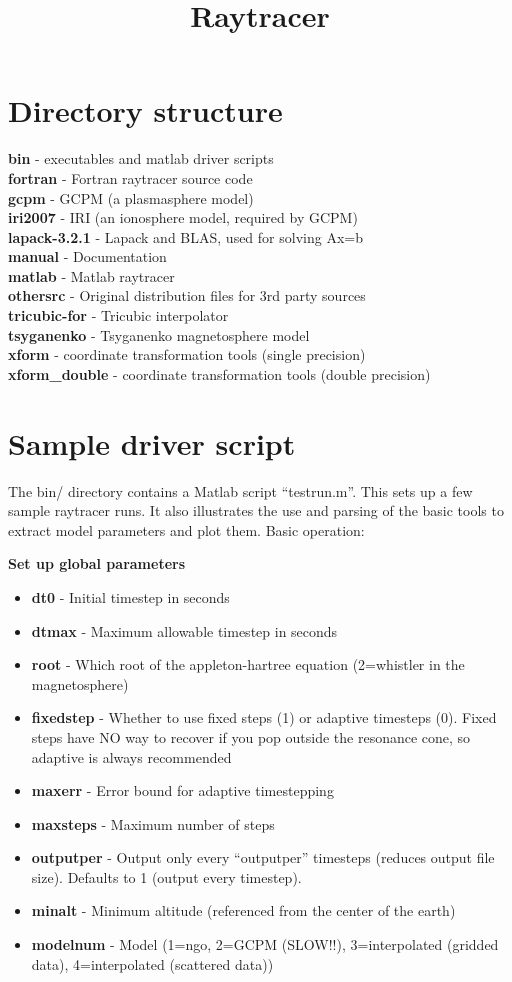 \documentclass[10pt]{article}
\begin{document}
\title{Raytracer}
\section{Directory structure}
{\bf bin} - executables and matlab driver scripts \\
{\bf fortran} - Fortran raytracer source code \\
{\bf gcpm} - GCPM (a plasmasphere model) \\
{\bf iri2007} - IRI (an ionosphere model, required by GCPM) \\
{\bf lapack-3.2.1} - Lapack and BLAS, used for solving Ax=b \\
{\bf manual} - Documentation \\
{\bf matlab} - Matlab raytracer \\
{\bf othersrc} - Original distribution files for 3rd party sources \\
{\bf tricubic-for} - Tricubic interpolator \\
{\bf tsyganenko} - Tsyganenko magnetosphere model \\
{\bf xform} - coordinate transformation tools (single precision) \\
{\bf xform\_double} - coordinate transformation tools (double
precision) \\

\section{Sample driver script}
The bin/ directory contains a Matlab script ``testrun.m''.  This sets
up a few sample raytracer runs.  It also illustrates the use and
parsing of the basic tools to extract model parameters and plot them.
Basic operation:

{\bf Set up global parameters}
\begin{itemize}
\item {\bf dt0} - Initial timestep in seconds
\item {\bf dtmax} - Maximum allowable timestep in seconds
\item {\bf root} - Which root of the appleton-hartree equation
  (2=whistler in the magnetosphere)
\item {\bf fixedstep} - 
  Whether to use fixed steps (1) or adaptive timesteps (0).
  Fixed steps have NO way to recover if you pop outside the resonance
  cone, so adaptive is always recommended
\item {\bf maxerr} - Error bound for adaptive timestepping
\item {\bf maxsteps} - Maximum number of steps
\item {\bf outputper} - Output only every ``outputper'' timesteps
  (reduces output file size).  Defaults to 1 (output every timestep).
\item {\bf minalt} - Minimum altitude (referenced from the center of
  the earth)
\item {\bf modelnum} - Model (1=ngo, 2=GCPM (SLOW!!), 3=interpolated
  (gridded data),
  4=interpolated (scattered data))
\end{itemize}
\end{document}
